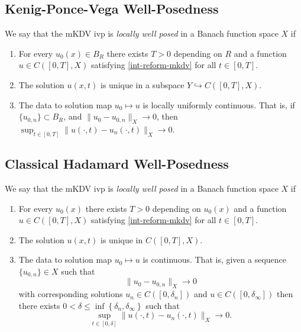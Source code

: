 \documentclass[12pt,reqno]{amsart}
\numberwithin{equation}{section}  %
\begin{document}
        \subsection{Kenig-Ponce-Vega Well-Posedness} 
        \label{ssec:kpv-wp}
	We say that the mKDV ivp is
	\emph{locally well posed} in a Banach function space
	$X$ if 
	\begin{enumerate}
		\item For every $u_{0}(x) \in
	B_R$ there exists $T>0$ depending on $R$ and a function
	\\
	$u \in C([0, T],
  X)$ satisfying \eqref{int-reform-mkdv} for all $t \in [0, T]$.
\item The solution $u(x,t)$ is unique in a subspace $Y \hookrightarrow
  C([0, T], X)$.  
\item The data to solution map $u_0 \mapsto u$ is locally uniformly continuous. That is,
  if$\{u_{0,n}\} \subset B_R$, and 
  $\|u_0 - u_{0, n} \|_{X} \to 0$, then $\sup_{t \in [0,T]} \|u(\cdot, t) - u_{n}(\cdot,t) \|_{X} \to
	0$.
	\end{enumerate}
  \subsection{Classical Hadamard Well-Posedness} 
  \label{ssec:hadamard-wp}
   We say that the mKDV ivp
   is
	\emph{locally well posed} in a Banach function space $X$ if
	\begin{enumerate}
    \item For every $u_{0}(x)$ there exists $T>0$ depending on $u_{0}(x)$
      and a function $u \in C([0, T],
  X)$ satisfying \eqref{int-reform-mkdv} for all $t \in [0, T]$.
\item The solution $u(x,t)$ is unique in $C([0,T], X)$.  
    \item
      The data to solution map $u_0 \mapsto u$ is continuous. That
      is, given a sequence $\{u_{0,n} \} \in X$
      such that $$\|u_{0} - u_{0,n} \|_{X} \to 0$$
      with corresponding solutions $u_{n} \in
      C([0,
      \delta_{n}])$ and $u \in C([0, \delta_{\infty}])$
      then there exists $0 < \delta \le \inf\left\{
      \delta_{n}, \delta_{\infty} \right\}$ such that 
      $$\sup_{t \in [0, \delta]} \|u(\cdot, t) - u_{n}(\cdot, t) \|_{X} \to 0 
      .$$
  \end{enumerate}
\end{document}
